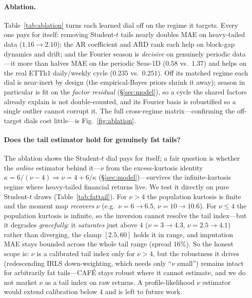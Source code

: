 \documentclass[10pt,twocolumn]{article}
\newcommand{\cafe}{CAF\'E}
\begin{document}
\paragraph{Ablation.} Table~\ref{tab:ablation} turns each learned dial off on the
regime it targets. Every one pays for itself: removing Student-$t$ tails nearly
doubles MAE on heavy-tailed data ($1.16\!\to\!2.10$); the AR coefficient and ARD
rank each help on block-gap dynamics and drift; and the Fourier season is
\emph{decisive} on genuinely periodic data---it more than halves MAE on the
periodic Seas-1D ($0.58$ vs.\ $1.37$) and helps on the real ETTh1 daily/weekly
cycle ($0.235$ vs.\ $0.251$). Off its matched regime each dial is near-inert by
design (the empirical-Bayes priors shrink it away); season in particular is fit
on the \emph{factor residual} (\S\ref{sec:model}), so a cycle the shared factors
already explain is not double-counted, and its Fourier basis is robustified so a
single outlier cannot corrupt it. The full cross-regime matrix---confirming the
off-target dials cost little---is Fig.~\ref{fig:ablation}.


\paragraph{Does the tail estimator hold for genuinely fat tails?} The ablation
shows the Student-$t$ dial pays for itself; a fair question is whether the
\emph{online} estimator behind it---$\nu$ from the excess-kurtosis identity
$\kappa=6/(\nu-4)\Rightarrow\nu=4+6/\kappa$ (\S\ref{sec:model})---survives the
infinite-kurtosis regime where heavy-tailed financial returns live. We test it
directly on pure Student-$t$ draws (Table~\ref{tab:fattail}). For $\nu>4$ the
population kurtosis is finite and the moment map \emph{recovers} $\nu$ (e.g.\
$\nu{=}6\to6.5$, $\nu{=}10\to10.6$). For $\nu\le4$ the population kurtosis is
infinite, so the inversion cannot resolve the tail index---but it degrades
\emph{gracefully}: it \emph{saturates} just above $4$ ($\nu{=}3\to4.3$,
$\nu{=}2.5\to4.1$) rather than diverging, the clamp $[2.5,60]$ holds it in range,
and imputation MAE stays bounded across the whole tail range (spread $16\%$). So
the honest scope is: $\nu$ is a calibrated tail index only for $\nu>4$, but the
robustness it drives (redescending IRLS down-weighting, which needs only ``$\nu$
small'') remains intact for arbitrarily fat tails---\cafe{} stays robust where it
cannot estimate, and we do not market $\nu$ as a tail index on raw returns. A
profile-likelihood $\nu$ estimator would extend calibration below $4$ and is left
to future work.

\end{document}
